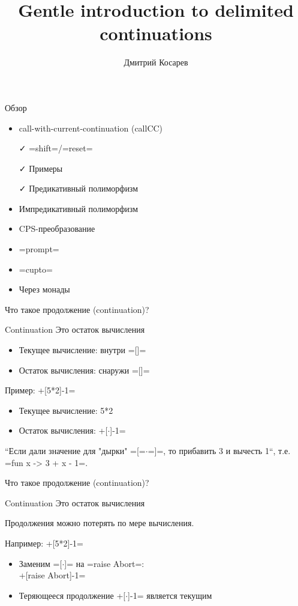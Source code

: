 \documentclass{beamer}
\title{Gentle introduction to delimited continuations}
\author{Дмитрий Косарев}
\begin{document}
\begin{frame} \titlepage \end{frame}

\begin{frame}{Обзор}
 
 \begin{itemize}
  \item call-with-current-continuation (callCC)
  \item[\faCheck] \camline=shift=/\camline=reset=
  \item[\faCheck] Примеры
  \item[\faCheck] Предикативный полиморфизм
  \item Импредикативный полиморфизм
  \item CPS-преобразование
  \item \camline=prompt=
  \item \camline=cupto=
  \item Через монады \cite{Dyvbig2007}
 \end{itemize}

\end{frame}


\begin{frame}[fragile]{Что такое продолжение (continuation)?}
 \begin{block}{Continuation}
Это остаток вычисления
\end{block}
\begin{itemize}
 \item Текущее вычисление: внутри  \hsinline=[]=
 \item Остаток вычисления: снаружи  \hsinline=[]=
\end{itemize}
Пример: +[5*2]-1=
\begin{itemize}
 \item Текущее вычисление: 5*2
 \item Остаток вычисления: +[$\cdot$]-1= 
\end{itemize}
\vspace{1cm}
``Если дали значение для "дырки" \hsinline=[=$\cdot$\hsinline=]=, то прибавить 3 и вычесть 1``, т.е. \camline=fun x -> 3 + x - 1=.
\end{frame}

\begin{frame}[fragile]{Что такое продолжение (continuation)?}
 \begin{block}{Continuation}
Это остаток вычисления
\end{block}
Продолжения можно потерять по мере вычисления. 

Например: +[5*2]-1=
\begin{itemize}
 \item Заменим \hsinline=[$\cdot$]=  на \camline=raise Abort=:\\
    +[raise Abort]-1=
 \item Теряющееся продолжение +[$\cdot$]-1= является текущим
\end{itemize}
\vspace{1cm}
\end{frame}
\end{document}
